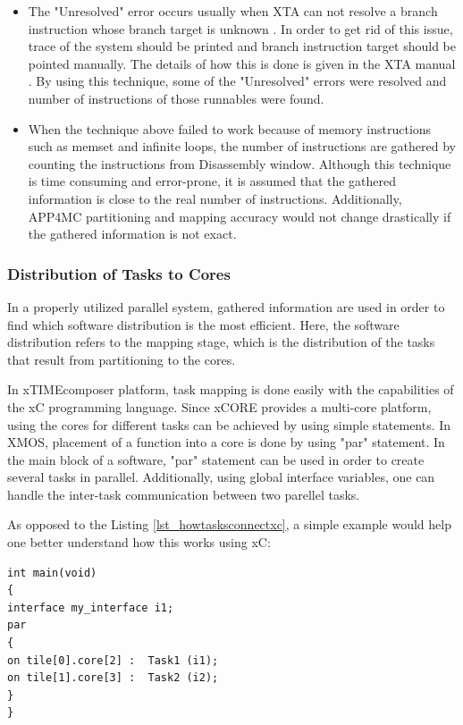 \begin{itemize}
	\item The "Unresolved" error occurs usually when XTA can not resolve a branch instruction whose branch target is unknown \cite{xtamanual}. In order to get rid of this issue, trace of the system should be printed and branch instruction target should be pointed manually. The details of how this is done is given in the XTA manual \cite{xtamanual}. By using this technique, some of the "Unresolved" errors were resolved and number of instructions of those runnables were found.
	
	\item When the technique above failed to work because of memory instructions such as memset and infinite loops, the number of instructions are gathered by counting the instructions from Disassembly window. Although this technique is time consuming and error-prone, it is assumed that the gathered information is close to the real number of instructions. Additionally, APP4MC partitioning and mapping accuracy would not change drastically if the gathered information is not exact. 
\end{itemize}

\subsubsection{Distribution of Tasks to Cores}
In a properly utilized parallel system, gathered information are used in order to find which software distribution is the most efficient. Here, the software distribution refers to the mapping stage, which is the distribution of the tasks that result from partitioning to the cores.

In xTIMEcomposer platform, task mapping is done easily with the capabilities of the xC programming language. Since xCORE provides a multi-core platform, using the cores for different tasks can be achieved by using simple statements. In XMOS, placement of a function into a core is done by using "par" statement. In the main block of a software, "par" statement can be used in order to create several tasks in parallel. Additionally, using global interface variables, one can handle the inter-task communication between two parellel tasks.

As opposed to the Listing \ref{lst_howtasksconnectxc}, a simple example would help one better understand how this works using xC:

\begin{lstlisting}
int main(void)
{
interface my_interface i1;
par
{
on tile[0].core[2] :  Task1 (i1);
on tile[1].core[3] :  Task2 (i2);
}
}
\end{lstlisting}

